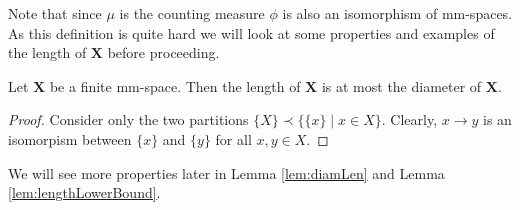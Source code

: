 Note that since $\mu$ is the counting measure $\phi$ is also an isomorphism of mm-spaces.
As this definition is quite hard we will look at some properties and examples of the length of $\boldsymbol{X}$ before proceeding.
\begin{lemma}
	Let $\boldsymbol{X}$ be a finite mm-space. Then the length of $\boldsymbol{X}$ is at most the diameter of $\boldsymbol{X}$.
\end{lemma}
\begin{proof}
	Consider only the two partitions $\{X\}\prec\{\{x\}\mid x\in X\}$. Clearly,  $x\to y$ is an isomorpism between $\{x\}$ and $\{y\}$ for all $x,y\in X$.
\end{proof}
		
We will see more properties later in Lemma \ref{lem:diamLen} and Lemma \ref{lem:lengthLowerBound}.
		
